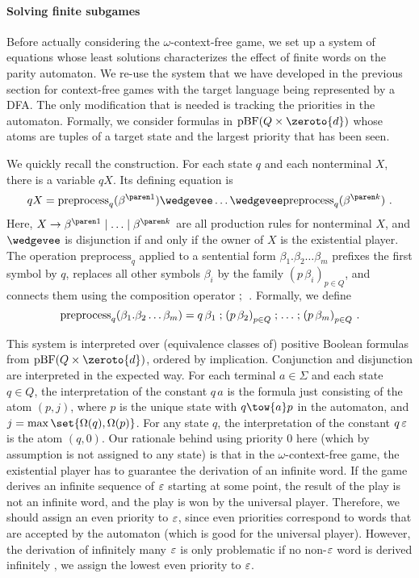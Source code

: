 \documentclass[../../diss.tex]{subfiles}
\begin{document}
\paragraph{Solving finite subgames}

Before actually considering the $\omega$-context-free game, we set up a system of equations whose least solutions characterizes the effect of finite words on the parity automaton.
We re-use the system that we have developed in the previous section for context-free games with the target language being represented by a DFA.\@
The only modification that is needed is tracking the priorities in the automaton.
Formally, we consider formulas in $\pBF(Q \times \zeroto{d})$ whose atoms are tuples of a target state and the largest priority that has been seen.

We quickly recall the construction.
For each state $q$ and each nonterminal $X$, there is a variable $qX$.
Its defining equation is
\[
    qX = \text{preprocess}_q(\itr{\beta}{1}) \wedgevee \ldots \wedgevee \text{preprocess}_q(\itr{\beta}{k})
    \ .
\]
Here, $X \to \itr{\beta}{1} \mid \ldots \mid \itr{\beta}{k}$ are all production rules for nonterminal $X$, and $\wedgevee$ is disjunction if and only if the owner of $X$ is the existential player.
The operation $\text{preprocess}_q$ applied to a sentential form $\beta_1.\beta_2 \ldots \beta_m$ prefixes the first symbol by $q$, replaces all other symbols $\beta_i$ by the family ${(p\,\beta_i)}_{p \in Q}$, and connects them using the composition operator $\mathrel{;}$\ .
Formally, we define
\[
    \text{preprocess}_q(\beta_1.\beta_2 \ldots \beta_m) = q\,\beta_1 \mathrel{;} {(p \, \beta_2)}_{p \in Q} \mathrel{;} \ldots \mathrel{;} {(p \, \beta_m)}_{p \in Q}
    \ .
\]

This system is interpreted over (equivalence classes of) positive Boolean formulas from $\pBF(Q \times \zeroto{d})$, ordered by implication.
Conjunction and disjunction are interpreted in the expected way.
For each terminal $a \in \Sigma$ and each state $q \in Q$, the interpretation of the constant $q \, a$ is the formula just consisting of the atom $(p,j)$, where $p$ is the unique state with $q \tow{a} p$ in the automaton, and $j = \max \set{ \Omega(q), \Omega(p)}$.
For any state $q$, the interpretation of the constant $q \, \varepsilon$ is the atom $(q,0)$.
Our rationale behind using priority $0$ here (which by assumption is not assigned to any state) is that in the $\omega$-context-free game, the existential player has to guarantee the derivation of an infinite word.
If the game derives an infinite sequence of $\varepsilon$ starting at some point, the result of the play is not an infinite word, and the play is won by the universal player.
Therefore, we should assign an even priority to $\varepsilon$, since even priorities correspond to words that are accepted by the automaton (which is good for the universal player).
However, the derivation of infinitely many $\varepsilon$ is only problematic if no non-$\varepsilon$ word is derived infinitely , we assign the lowest even priority to $\varepsilon$.
\end{document}

